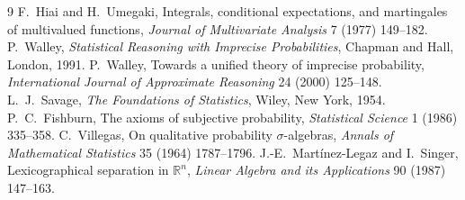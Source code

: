 \documentclass[11pt]{article}
\theoremstyle{definition}
\theoremstyle{remark}
\newcommand{\R}{\mathbb R}
\begin{document}
\begin{thebibliography}{9}
 F.~Hiai and H.~Umegaki, Integrals, conditional expectations, and martingales of multivalued functions, \emph{Journal of Multivariate Analysis} 7 (1977) 149--182.
 P.~Walley, \emph{Statistical Reasoning with Imprecise Probabilities}, Chapman and Hall, London, 1991.
 P.~Walley, Towards a unified theory of imprecise probability, \emph{International Journal of Approximate Reasoning} 24 (2000) 125--148.
 L.~J.~Savage, \emph{The Foundations of Statistics}, Wiley, New York, 1954.
 P.~C.~Fishburn, The axioms of subjective probability, \emph{Statistical Science} 1 (1986) 335--358.
 C.~Villegas, On qualitative probability $\sigma$-algebras, \emph{Annals of Mathematical Statistics} 35 (1964) 1787--1796.
 J.-E.~Mart\'inez-Legaz and I.~Singer, Lexicographical separation in $\R^n$, \emph{Linear Algebra and its Applications} 90 (1987) 147--163.
\end{thebibliography}
\end{document}
